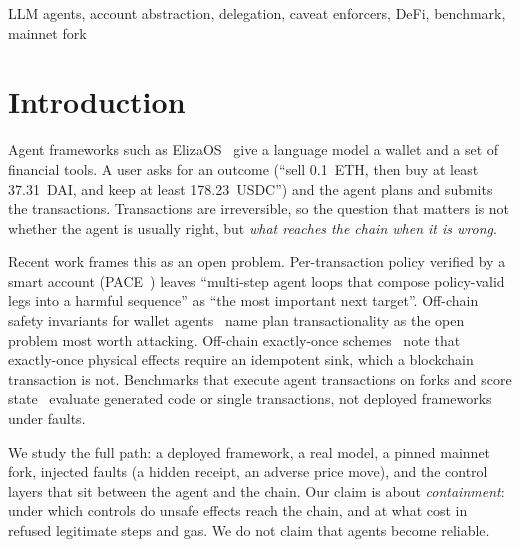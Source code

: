 \documentclass[conference]{IEEEtran}
\begin{document}
\begin{IEEEkeywords}
LLM agents, account abstraction, delegation, caveat enforcers, DeFi, benchmark, mainnet fork
\end{IEEEkeywords}

\section{Introduction}

Agent frameworks such as ElizaOS~\cite{elizaos} give a language model a wallet and a set of financial tools.
A user asks for an outcome (``sell 0.1~ETH, then buy at least 37.31~DAI, and keep at least 178.23~USDC'') and the
agent plans and submits the transactions. Transactions are irreversible, so the question that matters is not whether
the agent is usually right, but \emph{what reaches the chain when it is wrong}.

Recent work frames this as an open problem. Per-transaction policy verified by a smart account (PACE~\cite{pace2026})
leaves ``multi-step agent loops that compose policy-valid legs into a harmful sequence'' as ``the most important next
target''. Off-chain safety invariants for wallet agents~\cite{yin2026invariants} name plan transactionality as the
open problem most worth attacking. Off-chain exactly-once schemes~\cite{caplease2026,aidguard2026} note that
exactly-once physical effects require an idempotent sink, which a blockchain transaction is not. Benchmarks that execute agent
transactions on forks and score state~\cite{evmquestbench2026,intent2tx2026} evaluate generated code or single
transactions, not deployed frameworks under faults.

We study the full path: a deployed framework, a real model, a pinned mainnet fork, injected faults (a hidden
receipt, an adverse price move), and the control layers that sit between the agent and the chain. Our claim is about
\emph{containment}: under which controls do unsafe effects reach the chain, and at what cost in refused legitimate
steps and gas. We do not claim that agents become reliable.
\end{document}
